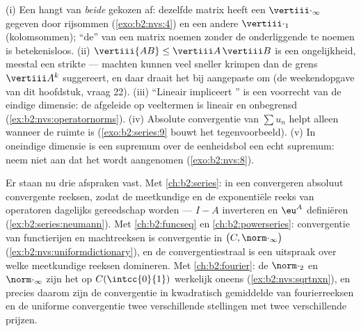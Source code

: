 \begin{remark}\label{rem:b2:nvs:pitfalls}
(i) Een  hangt van \emph{beide} gekozen  af:
dezelfde matrix heeft een $\vertiii\cdot_\infty$ gegeven door
rijsommen (\cref{exo:b2:nvs:4}) en een andere $\vertiii\cdot_1$
(kolomsommen); ``de''  van een matrix noemen zonder de
onderliggende  te noemen is betekenisloos. (ii)
$\vertiii{AB} \leq \vertiii A\,\vertiii B$ is een ongelijkheid,
meestal een strikte --- machten kunnen veel sneller krimpen dan de
grens $\vertiii A^k$ suggereert, en daar draait het bij aangepaste
 om (de weekendopgave van dit hoofdstuk, vraag 22). (iii)
``Lineair impliceert '' is een voorrecht van de eindige
dimensie: de afgeleide op veeltermen is lineair en onbegrensd
(\cref{ex:b2:nvs:operatornorms}). (iv) Absolute convergentie van
$\sum u_n$ helpt alleen wanneer de ruimte  is
(\cref{exo:b2:series:9} bouwt het tegenvoorbeeld). (v) In
oneindige dimensie is een supremum over de eenheidsbol een echt
supremum: neem niet aan dat het wordt aangenomen
(\cref{exo:b2:nvs:8}).
\end{remark}

\begin{remark}\label{rem:b2:nvs:perspectives}
Er staan nu drie afspraken vast. Met \cref{ch:b2:series}: in een
 convergeren absoluut convergente reeksen, zodat de
meetkundige en de exponentiële reeks van operatoren dagelijks
gereedschap worden --- $I - A$ inverteren en $\eu^{A}$ definiëren
(\cref{ex:b2:series:neumann}). Met \cref{ch:b2:funcseq} en
\cref{ch:b2:powerseries}: convergentie van functierijen en
machtreeksen is convergentie in $\bigl(C,
\norm\cdot_\infty\bigr)$ (\cref{ex:b2:nvs:uniformdictionary}), en
de convergentiestraal is een uitspraak over welke meetkundige
reeksen domineren. Met \cref{ch:b2:fourier}: de 
$\norm\cdot_2$ en $\norm\cdot_\infty$ zijn het op
$C(\intcc{0}{1})$ werkelijk oneens (\cref{ex:b2:nvs:sqrtnxn}), en
precies daarom zijn de convergentie in kwadratisch gemiddelde van
fourierreeksen en de uniforme convergentie twee verschillende
stellingen met twee verschillende prijzen.
\end{remark}

